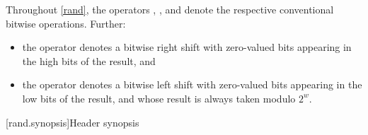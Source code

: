 \pnum
Throughout \ref{rand},
the operators
\bitand, \bitor, and \xor{}
denote the respective conventional bitwise operations.
Further:
\begin{itemize}
 \item
   the operator \rightshift{} denotes a bitwise right shift
   with zero-valued bits appearing in the high bits of the result, and
 \item
   the operator  denotes a bitwise left shift
   with zero-valued bits appearing in the low bits of the result,
   and whose result is always taken modulo $2^w$.
\end{itemize}




[rand.synopsis]{Header  synopsis}


